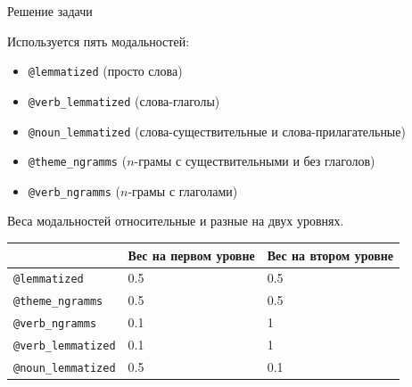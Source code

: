 \begin{frame}{Решение задачи}


Используется пять модальностей:
\begin{itemize}
    \item \texttt{@lemmatized} (просто слова)
    \item \texttt{@verb\_lemmatized} (слова-глаголы)
    \item \texttt{@noun\_lemmatized} (слова-существительные и слова-прилагательные)
    \item \texttt{@theme\_ngramms} ($n$-грамы с существительными и без глаголов)
    \item \texttt{@verb\_ngramms} ($n$-грамы с глаголами)
\end{itemize}


\bigskip
Веса модальностей относительные и разные на двух уровнях.
\begin{table}[]
\begin{tabular}{|l|l|l|}\hline
                & Вес на первом уровне & Вес на втором уровне \\ \hline
\texttt{@lemmatized}     & 0.5                  & 0.5                  \\ \hline
 \texttt{@theme\_ngramms}   & 0.5                  & 0.5                  \\ \hline
\texttt{@verb\_ngramms}    & 0.1                  & 1                    \\ \hline
\texttt{@verb\_lemmatized} & 0.1                  & 1                    \\ \hline
\texttt{@noun\_lemmatized} & 0.5                  & 0.1                 \\ \hline
\end{tabular}
\end{table}

\end{frame}

